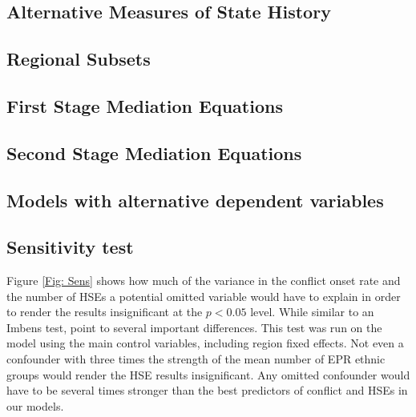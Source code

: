 \documentclass[12pt]{article}
\begin{document}
    
    
    
\clearpage    

\subsection{Alternative Measures of State History}

    
    

    
\clearpage    


\subsection{Regional Subsets}

    


    
\clearpage    

\subsection{First Stage Mediation Equations}

    
    
    
\clearpage
 
 
\subsection{Second Stage Mediation Equations}


\clearpage
    
\clearpage  
 

\subsection{Models with alternative dependent variables}



    
\clearpage  


\subsection{Sensitivity test}

Figure \ref{Fig: Sens} shows how much of the variance in the conflict onset rate and the number of HSEs a potential omitted variable would have to explain in order to render the results insignificant at the $p<0.05$ level. While similar to an Imbens test, \citet{Cinelli2020} point to several important differences. This test was run on the model using the main control variables, including region fixed effects. Not even a confounder with three times the strength of the mean number of EPR ethnic groups would render the HSE results insignificant. Any omitted confounder would have to be several times stronger than the best predictors of conflict and HSEs in our models.
\end{document}
